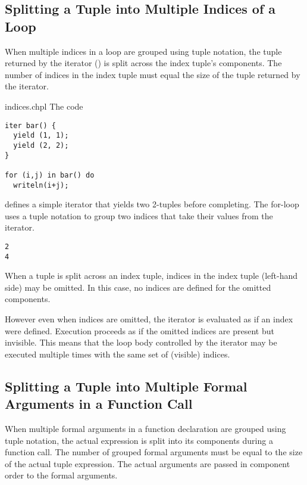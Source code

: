 \subsection{Splitting a Tuple into Multiple Indices of a Loop}
\label{Indices_in_a_Tuple}

When multiple indices in a loop are grouped using tuple notation, the tuple
returned by the iterator () is split across the index tuple's components.  The
number of indices in the index tuple must equal the size of the tuple
returned by the iterator.

\begin{chapelexample}{indices.chpl}
The code
\begin{chapel}
\begin{verbatim}
iter bar() {
  yield (1, 1);
  yield (2, 2);
}

for (i,j) in bar() do
  writeln(i+j);
\end{verbatim}
\end{chapel}
defines a simple iterator that yields two 2-tuples before completing.
The for-loop uses a tuple notation to group two indices that take
their values from the iterator.
\begin{chapeloutput}
\begin{verbatim}
2
4
\end{verbatim}
\end{chapeloutput}
\end{chapelexample}

When a tuple is split across an index tuple, indices in the index
tuple (left-hand side) may be omitted.  In this case, no indices are
defined for the omitted components.

However even when indices are omitted, the iterator is
evaluated as if an index were defined.  Execution proceeds as if the
omitted indices are present but invisible.  This means that the loop body
controlled by the iterator may be executed multiple times with the
same set of (visible) indices.

\subsection{Splitting a Tuple into Multiple Formal Arguments in a Function Call}
\label{Formal_Argument_Declarations_in_a_Tuple}

When multiple formal arguments in a function declaration are grouped
using tuple notation, the actual expression is split into its
components during a function call.  The number of grouped formal
arguments must be equal to the size of the actual tuple expression.
The actual arguments are passed in component order to the formal
arguments.

